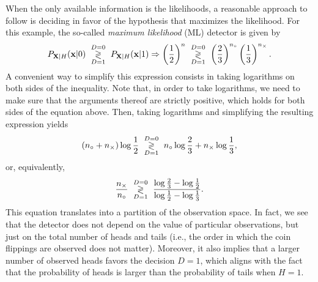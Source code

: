 \begin{solution}
\begin{itemize}
		When the only available information is the likelihoods, a reasonable approach to follow is deciding in favor of the hypothesis that maximizes the likelihood. For this example, the so-called {\em maximum likelihood} (ML) detector is given by
		$$P_{{\bf X}|H}({\bf x}|0)\,\, \underset{D=1}{\overset{D=0}{\gtrless}}\,\, P_{{\bf X}|H}({\bf x}|1) \Rightarrow \left( \frac{1}{2}\right)^{n} \,\, \underset{D=1}{\overset{D=0}{\gtrless}}\,\, \left( \frac{2}{3}\right)^{n_\circ} \left( \frac{1}{3}\right)^{n_\times}.$$
		A convenient way to simplify this expression consists in taking logarithms on both sides of the inequality. Note that, in order to take logarithms, we need to make sure that the arguments thereof are strictly positive, which holds for both sides of the equation above. Then, taking logarithms and simplifying the resulting expression yields
		$$(n_\circ + n_\times) \log\frac{1}{2} \,\, \underset{D=1}{\overset{D=0}{\gtrless}}\,\, n_\circ \log\frac{2}{3} + n_\times \log\frac{1}{3},$$
		or, equivalently,
		$$\frac{n_\times}{n_\circ} \,\, \underset{D=1}{\overset{D=0}{\gtrless}}\,\, \frac{\log\frac{2}{3} - \log\frac{1}{2}}{\log\frac{1}{2} - \log\frac{1}{3}}.$$
		This equation translates into a partition of the observation space. In fact, we see that the detector does not depend on the value of particular observations, but just on the total number of heads and tails (i.e., the order in which the coin flippings are observed does not matter). Moreover, it also implies that a larger number of observed heads favors the decision $D=1$, which aligns with the fact that the probability of heads is larger than the probability of tails when $H=1$.
		

\end{itemize}
\end{solution}
